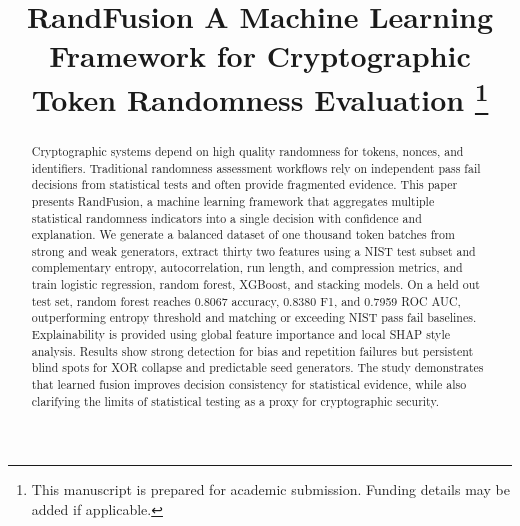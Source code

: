\documentclass[conference]{IEEEtran}
\begin{document}
\title{RandFusion A Machine Learning Framework for Cryptographic Token Randomness Evaluation
\thanks{This manuscript is prepared for academic submission. Funding details may be added if applicable.}
}

\author{
\and
{}
\and
{}
}

\maketitle

\begin{abstract}
Cryptographic systems depend on high quality randomness for tokens, nonces, and identifiers. Traditional randomness assessment workflows rely on independent pass fail decisions from statistical tests and often provide fragmented evidence. This paper presents RandFusion, a machine learning framework that aggregates multiple statistical randomness indicators into a single decision with confidence and explanation. We generate a balanced dataset of one thousand token batches from strong and weak generators, extract thirty two features using a NIST test subset and complementary entropy, autocorrelation, run length, and compression metrics, and train logistic regression, random forest, XGBoost, and stacking models. On a held out test set, random forest reaches 0.8067 accuracy, 0.8380 F1, and 0.7959 ROC AUC, outperforming entropy threshold and matching or exceeding NIST pass fail baselines. Explainability is provided using global feature importance and local SHAP style analysis. Results show strong detection for bias and repetition failures but persistent blind spots for XOR collapse and predictable seed generators. The study demonstrates that learned fusion improves decision consistency for statistical evidence, while also clarifying the limits of statistical testing as a proxy for cryptographic security.
\end{abstract}
\end{document}
